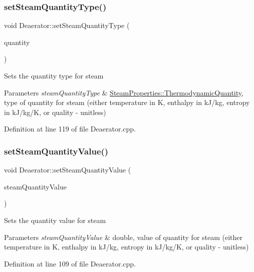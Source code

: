 \subsubsection{\texorpdfstring{set\+Steam\+Quantity\+Type()}{setSteamQuantityType()}}
{\footnotesize\ttfamily void Deaerator\+::set\+Steam\+Quantity\+Type (\begin{DoxyParamCaption}\item[{\hyperlink{class_steam_properties_ae0294bedf7d178c2d8fb6aed0f62fbff}{Steam\+Properties\+::\+Thermodynamic\+Quantity}}]{quantity }\end{DoxyParamCaption})}

Sets the quantity type for steam 
\begin{DoxyParams}{Parameters}
{\em steam\+Quantity\+Type} & \hyperlink{class_steam_properties_ae0294bedf7d178c2d8fb6aed0f62fbff}{Steam\+Properties\+::\+Thermodynamic\+Quantity}, type of quantity for steam (either temperature in K, enthalpy in k\+J/kg, entropy in k\+J/kg/K, or quality -\/ unitless) \\
\hline
\end{DoxyParams}


Definition at line 119 of file Deaerator.\+cpp.

\mbox{\label{class_deaerator_a101399a8b66c3ff1fecf884fd1b1373d}} 
\subsubsection{\texorpdfstring{set\+Steam\+Quantity\+Value()}{setSteamQuantityValue()}}
{\footnotesize\ttfamily void Deaerator\+::set\+Steam\+Quantity\+Value (\begin{DoxyParamCaption}\item[{double}]{steam\+Quantity\+Value }\end{DoxyParamCaption})}

Sets the quantity value for steam 
\begin{DoxyParams}{Parameters}
{\em steam\+Quantity\+Value} & double, value of quantity for steam (either temperature in K, enthalpy in k\+J/kg, entropy in k\+J/kg/K, or quality -\/ unitless) \\
\hline
\end{DoxyParams}


Definition at line 109 of file Deaerator.\+cpp.

